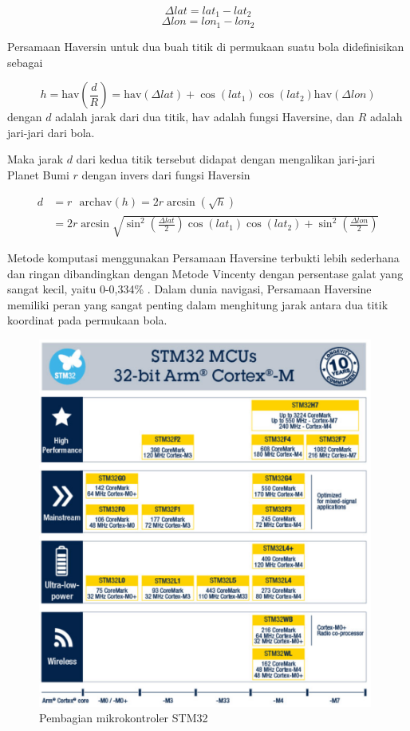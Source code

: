 \begin{equation}
	\Delta lat = lat_1 - lat_2
	\label{eq:delt-lat}
\end{equation}
\begin{equation}
	\Delta lon = lon_1 - lon_2
	\label{eq:delt-lon}
\end{equation}


Persamaan Haversin untuk dua buah titik di permukaan suatu bola didefinisikan sebagai

\begin{equation}
	h = \mathrm{hav}\left(\frac{d}{R}\right) = \mathrm{hav}\left(\Delta lat\right) + \cos{\left(lat_1\right)} \cos{\left(lat_2\right)} \mathrm{hav}\left(\Delta lon\right)
	\label{eq:haversine2}
\end{equation}
dengan $d$ adalah jarak dari dua titik, $\mathrm{hav}$ adalah fungsi Haversine, dan $R$ adalah jari-jari dari bola.

Maka jarak $d$ dari kedua titik tersebut didapat dengan mengalikan jari-jari Planet Bumi $r$ dengan invers dari fungsi Haversin \cite{Omatu2013}

$$
\begin{aligned}
	d &= r \text{ }\mathrm{archav}(h) = 2r \arcsin{\left(\sqrt{h}\right)} \\
	&= 2r \arcsin{\sqrt{\sin^2{\left(\frac{\Delta lat}{2}\right)}  \cos{(lat_1)}\cos{(lat_2)} +\sin^2{\left(\frac{\Delta lon}{2}\right)}}}
\end{aligned} 
$$

Metode komputasi menggunakan Persamaan Haversine terbukti lebih sederhana dan ringan dibandingkan dengan Metode Vincenty dengan persentase galat yang sangat kecil, yaitu 0-0,334\% \cite{Mahmoud2016}. Dalam dunia navigasi, Persamaan Haversine memiliki peran yang sangat penting dalam menghitung jarak antara dua titik koordinat pada permukaan bola.

\begin{figure}[H]
	\centering
	\includegraphics[width=11cm]{contents/chapter-2/stm-32-groups.png}
	\caption{Pembagian mikrokontroler STM32 \cite{STMicroelectronics2023}}
	\label{Fig: stm32-groups}
\end{figure}
